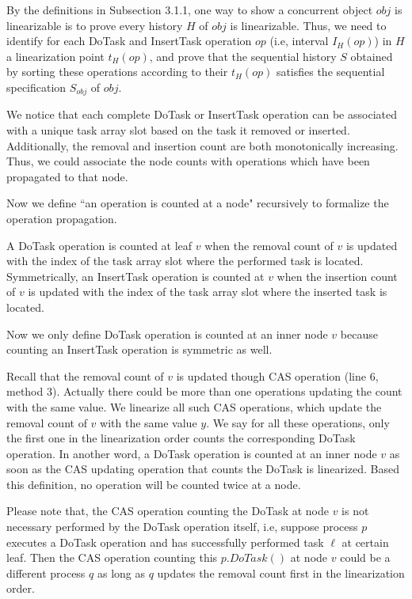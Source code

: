 By the definitions in Subsection 3.1.1, one way to show a concurrent object $obj$ is linearizable is to prove every history $H$ of $obj$ is linearizable. Thus, we need to identify for each DoTask and InsertTask operation $op$ (i.e, interval $I_H(op)$) in $H$ a linearization point $t_H(op)$, and prove that the sequential history $S$ obtained by sorting these operations according to their $t_H(op)$ satisfies the sequential specification  $S_{obj}$  of $obj$.

We notice that each complete DoTask or InsertTask operation can be associated with a unique task array slot based on the task it removed or inserted. Additionally, the removal and insertion count are both monotonically increasing. Thus, we could associate the node counts with operations which have been propagated to that node.

Now we define ``an operation is counted at a node" recursively to formalize the operation propagation.

A DoTask operation is counted at leaf $v$ when the removal count of $v$ is updated with the index of the task array slot where the performed task is located. Symmetrically, an InsertTask operation is counted at $v$ when the insertion count of $v$ is updated with the index of the task array slot where the inserted task is located.

Now we only define DoTask operation is counted at an inner node $v$ because counting an InsertTask operation is symmetric as well.

Recall that the removal count of $v$ is updated though CAS operation (line 6, method 3). Actually there could be more than one operations updating the count with the same value. We linearize all such CAS operations, which update the removal count of $v$ with the same value $y$. We say for all these operations, only the first one in the linearization order counts the corresponding DoTask operation. In another word, a DoTask operation is counted at an inner node $v$ as soon as the CAS updating operation that counts the DoTask is linearized. Based this definition, no operation will be counted twice at a node.

Please note that, the CAS operation counting the DoTask at node $v$ is not necessary performed by the DoTask operation itself, i.e, suppose process $p$ executes a DoTask operation and has successfully performed task $\ell$ at certain leaf. Then the CAS operation counting this $p.DoTask()$ at node $v$ could be a different process $q$ as long as $q$ updates the removal count first in the linearization order.

